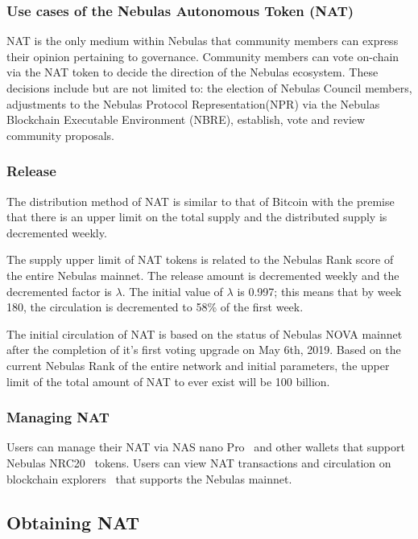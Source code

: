 \subsubsection{Use cases of the Nebulas Autonomous Token (NAT)}


NAT is the only medium within Nebulas that community members can express their opinion pertaining to governance. Community members can vote on-chain via the NAT token to decide the direction of the Nebulas ecosystem. These decisions include but are not limited to: the election of Nebulas Council members, adjustments to the Nebulas Protocol Representation(NPR) via the Nebulas Blockchain Executable Environment (NBRE), establish, vote and review community proposals.

\subsubsection{Release}

The distribution method of NAT is similar to that of Bitcoin with the premise that there is an upper limit on the total supply and the distributed supply is decremented weekly.

The supply upper limit of NAT tokens is related to the Nebulas Rank score of
the entire Nebulas mainnet. The release amount is decremented weekly and the
decremented factor is $\lambda$. The initial value of $\lambda$ is 0.997; this means that by week 180, the circulation is decremented to 58\% of the first week.

The initial circulation of NAT is based on the status of Nebulas NOVA mainnet after the completion of it's first voting upgrade on May 6th, 2019. Based on the current Nebulas Rank of the entire network and initial parameters, the upper limit of the total amount of NAT to ever exist will be 100 billion.

\subsubsection{Managing NAT}

Users can manage their NAT via NAS nano Pro~\cite{NASnano} and other wallets that support Nebulas NRC20~\cite{wallets} tokens. Users can view NAT transactions and circulation on blockchain explorers~\cite{explorer} that supports the Nebulas mainnet.

\subsection{Obtaining NAT}

